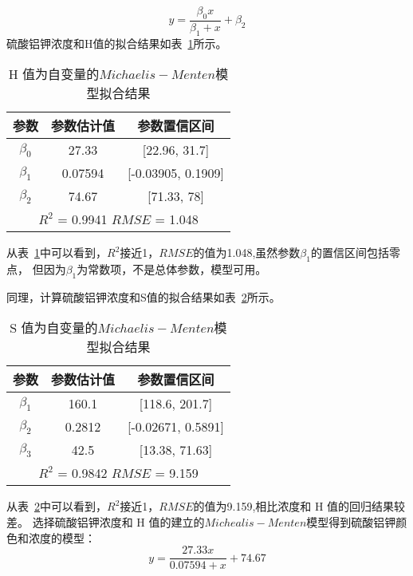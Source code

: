     $$y=\frac{\beta_0x}{\beta_1+x}+\beta_2$$
    硫酸铝钾浓度和H值的拟合结果如表~\ref{硫酸铝钾浓度和H值M-M}所示。
    \begin{table}[H]
      \centering
      \caption{H 值为自变量的$Michaelis-Menten$模型拟合结果}
      \label{硫酸铝钾浓度和H值M-M}
      \begin{tabular}{@{}ccc@{}}
      \toprule
      参数        & 参数估计值      & 参数置信区间                   \\ \midrule
      $\beta_0$     & 27.33     & {[}22.96, 31.7{]}     \\
      $\beta_1$     & 0.07594   & {[}-0.03905, 0.1909{]}    \\
      $\beta_2$     & 74.67     & {[}71.33, 78{]}         \\
      \hline
      \multicolumn{3}{c}{$R^2$ = 0.9941   $RMSE$ = 1.048} \\ \bottomrule
      \end{tabular}
    \end{table}
    
    从表~\ref{硫酸铝钾浓度和H值M-M}中可以看到，$R^2$接近1，$RMSE$的值为1.048,虽然参数$\beta_1$的置信区间包括零点，
    但因为$\beta_1$为常数项，不是总体参数，模型可用。

    同理，计算硫酸铝钾浓度和S值的拟合结果如表~\ref{硫酸铝钾浓度和S值M-M}所示。
    
    \begin{table}[H]
      \centering
      \caption{S 值为自变量的$Michaelis-Menten$模型拟合结果}
      \label{硫酸铝钾浓度和S值M-M}
      \begin{tabular}{@{}ccc@{}}
      \toprule
      参数        & 参数估计值      & 参数置信区间                   \\ \midrule
      $\beta_1$     & 160.1     & {[}118.6, 201.7{]}     \\
      $\beta_2$     & 0.2812   & {[}-0.02671, 0.5891{]}    \\
      $\beta_3$     & 42.5     & {[}13.38, 71.63{]}         \\
      \hline
      \multicolumn{3}{c}{$R^2$ = 0.9842   $RMSE$ = 9.159} \\ \bottomrule
      \end{tabular}
    \end{table}
    
    从表~\ref{硫酸铝钾浓度和S值M-M}中可以看到，$R^2$接近1，$RMSE$的值为9.159,相比浓度和 H 值的回归结果较差。
    选择硫酸铝钾浓度和 H 值的建立的$Michealis-Menten$模型得到硫酸铝钾颜色和浓度的模型：
    $$y=\frac{27.33x}{0.07594+x}+74.67$$
    
